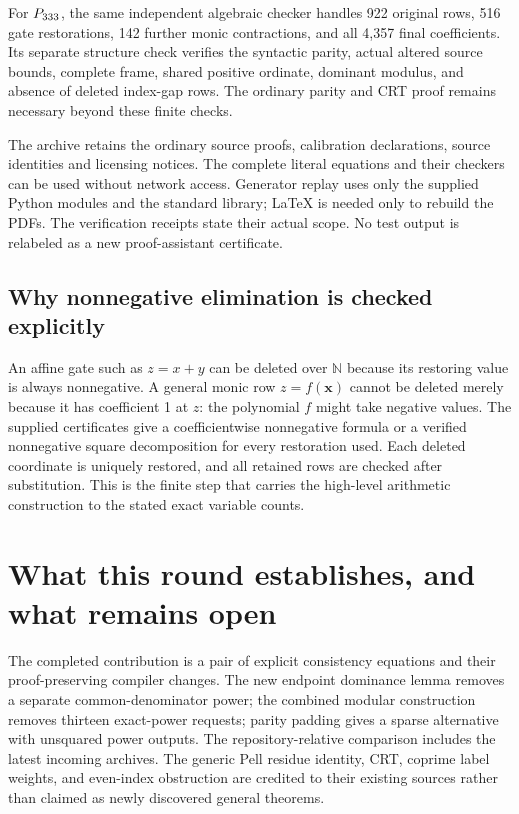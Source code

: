 \documentclass[11pt,letterpaper]{article}
\theoremstyle{remark}\newtheorem{remark}[theorem]{Remark}
\newcommand{\N}{\mathbb N}\newcommand{\Z}{\mathbb Z}
\begin{document}
For \(P_{333}\), the same independent algebraic checker handles
922 original rows, 516 gate restorations, 142 further monic contractions,
and all 4,357 final coefficients. Its separate structure check verifies
the syntactic parity, actual altered source bounds, complete frame, shared
positive ordinate, dominant modulus, and absence of deleted index-gap
rows. The ordinary parity and CRT proof remains necessary beyond these
finite checks.

The archive retains the ordinary source proofs, calibration declarations,
source identities and licensing notices. The complete literal equations
and their checkers can be used without network access. Generator replay
uses only the supplied Python modules and the standard library; LaTeX
is needed only to rebuild the PDFs. The verification receipts state their
actual scope. No test output is relabeled as a new proof-assistant
certificate.

\subsection{Why nonnegative elimination is checked explicitly}

An affine gate such as \(z=x+y\) can be deleted over \(\N\) because
its restoring value is always nonnegative. A general monic row
\(z=f(\boldsymbol x)\) cannot be deleted merely because it has
coefficient 1 at \(z\): the polynomial \(f\) might take negative
values. The supplied certificates give a coefficientwise nonnegative
formula or a verified nonnegative square decomposition for every
restoration used. Each deleted coordinate is uniquely restored, and all
retained rows are checked after substitution. This is the finite step
that carries the high-level arithmetic construction to the stated exact
variable counts.

\section{What this round establishes, and what remains open}

The completed contribution is a pair of explicit consistency equations
and their proof-preserving compiler changes. The new endpoint dominance
lemma removes a separate common-denominator power; the combined modular
construction removes thirteen exact-power requests; parity padding gives
a sparse alternative with unsquared power outputs. The repository-relative
comparison includes the latest incoming archives. The generic Pell residue
identity, CRT, coprime label weights, and even-index obstruction are
credited to their existing sources rather than claimed as newly discovered
general theorems.
\end{document}
